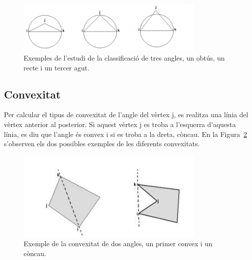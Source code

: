 \documentclass{article}
\begin{document}
\begin{figure}[h]
\centering
\includegraphics[width=260pt]{images/angles.png}
\caption {Exemples de l'estudi de la classificació de tres angles, un obtús, un recte i un tercer agut.}
\label {fig:angles}
\end{figure}

\subsection{Convexitat}
Per calcular el tipus de convexitat de l'angle del vèrtex j, es realitza una línia del vèrtex anterior al posterior.
Si aquest vèrtex j es troba a l'esquerra d'aquesta línia, es diu que l'angle és convex i si es troba a la dreta, còncau.
En la Figura~\ref{fig:convex} s'observen els dos possibles exemples de les diferents convexitats.

\begin{figure}[h]
\centering
\includegraphics[width=260pt]{images/convex.jpeg}
\caption {Exemple de la convexitat de dos angles, un primer convex i un còncau.}
\label {fig:convex}
\end{figure}
\end{document}
